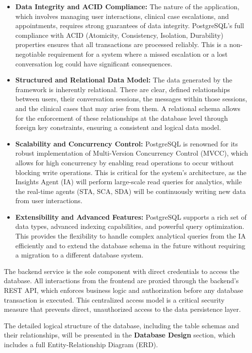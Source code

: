\begin{itemize}
    \item \textbf{Data Integrity and ACID Compliance:} The nature of the application, which involves managing user interactions, clinical case escalations, and appointments, requires strong guarantees of data integrity. PostgreSQL's full compliance with ACID (Atomicity, Consistency, Isolation, Durability) properties ensures that all transactions are processed reliably. This is a non-negotiable requirement for a system where a missed escalation or a lost conversation log could have significant consequences.
    \item \textbf{Structured and Relational Data Model:} The data generated by the framework is inherently relational. There are clear, defined relationships between users, their conversation sessions, the messages within those sessions, and the clinical cases that may arise from them. A relational schema allows for the enforcement of these relationships at the database level through foreign key constraints, ensuring a consistent and logical data model.
    \item \textbf{Scalability and Concurrency Control:} PostgreSQL is renowned for its robust implementation of Multi-Version Concurrency Control (MVCC), which allows for high concurrency by enabling read operations to occur without blocking write operations. This is critical for the system's architecture, as the Insights Agent (IA) will perform large-scale read queries for analytics, while the real-time agents (STA, SCA, SDA) will be continuously writing new data from user interactions.
    \item \textbf{Extensibility and Advanced Features:} PostgreSQL supports a rich set of data types, advanced indexing capabilities, and powerful query optimization. This provides the flexibility to handle complex analytical queries from the IA efficiently and to extend the database schema in the future without requiring a migration to a different database system.
\end{itemize}

The backend service is the sole component with direct credentials to access the database. All interactions from the frontend are proxied through the backend's REST API, which enforces business logic and authorization before any database transaction is executed. This centralized access model is a critical security measure that prevents direct, unauthorized access to the data persistence layer.

The detailed logical structure of the database, including the table schemas and their relationships, will be presented in the \textbf{Database Design} section, which includes a full Entity-Relationship Diagram (ERD).

